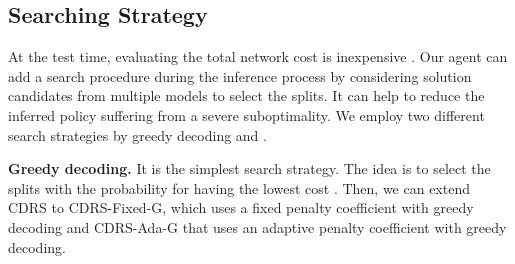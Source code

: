 
%
%



\vspace{-1mm}
\subsection{Searching Strategy}
At the test time, evaluating the total network cost is inexpensive . Our agent can add a search procedure during the inference process by considering solution candidates from multiple  models to select the splits. It can help to reduce the inferred policy suffering from a severe suboptimality. 
We employ two different search strategies by greedy decoding and  \cite{neural_bello}.

\textbf{Greedy decoding.} It is the simplest search strategy. The idea is to  select the splits with the  probability for having the lowest cost . %
Then, we can extend CDRS to CDRS-Fixed-G, which uses a fixed penalty coefficient with greedy decoding and CDRS-Ada-G that uses an adaptive penalty coefficient with greedy decoding. 

